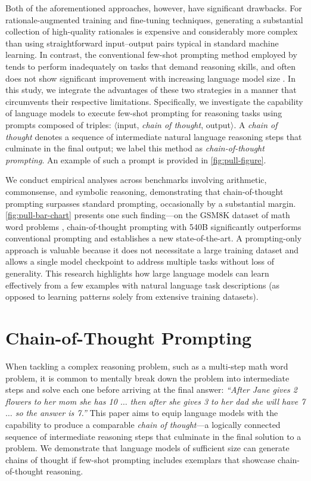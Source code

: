 Both of the aforementioned approaches, however, have significant drawbacks. For rationale-augmented training and fine-tuning techniques, generating a substantial collection of high-quality rationales is expensive and considerably more complex than using straightforward input--output pairs typical in standard machine learning. In contrast, the conventional few-shot prompting method employed by \citet{brown2020language} tends to perform inadequately on tasks that demand reasoning skills, and often does not show significant improvement with increasing language model size \citep{rae2021scaling}. In this study, we integrate the advantages of these two strategies in a manner that circumvents their respective limitations. Specifically, we investigate the capability of language models to execute few-shot prompting for reasoning tasks using prompts composed of triples: $\langle$input, \emph{chain of thought}, output$\rangle$.  
A \emph{chain of thought} denotes a sequence of intermediate natural language reasoning steps that culminate in the final output; we label this method as \textit{chain-of-thought prompting}. An example of such a prompt is provided in \cref{fig:pull-figure}.

We conduct empirical analyses across benchmarks involving arithmetic, commonsense, and symbolic reasoning, demonstrating that chain-of-thought prompting surpasses standard prompting, occasionally by a substantial margin. \cref{fig:pull-bar-chart} presents one such finding—on the GSM8K dataset of math word problems \citep{cobbe2021training}, chain-of-thought prompting with \palm{} 540B significantly outperforms conventional prompting and establishes a new state-of-the-art. A prompting-only approach is valuable because it does not necessitate a large training dataset and allows a single model checkpoint to address multiple tasks without loss of generality. This research highlights how large language models can learn effectively from a few examples with natural language task descriptions (as opposed to learning patterns solely from extensive training datasets).

\section{Chain-of-Thought Prompting} When tackling a complex reasoning problem, such as a multi-step math word problem, it is common to mentally break down the problem into intermediate steps and solve each one before arriving at the final answer: \textit{``After Jane gives 2 flowers to her mom she has 10 $\ldots$ then after she gives 3 to her dad she will have 7 $\ldots$ so the answer is 7.''} This paper aims to equip language models with the capability to produce a comparable \textit{chain of thought}—a logically connected sequence of intermediate reasoning steps that culminate in the final solution to a problem. We demonstrate that language models of sufficient size can generate chains of thought if few-shot prompting includes exemplars that showcase chain-of-thought reasoning.

